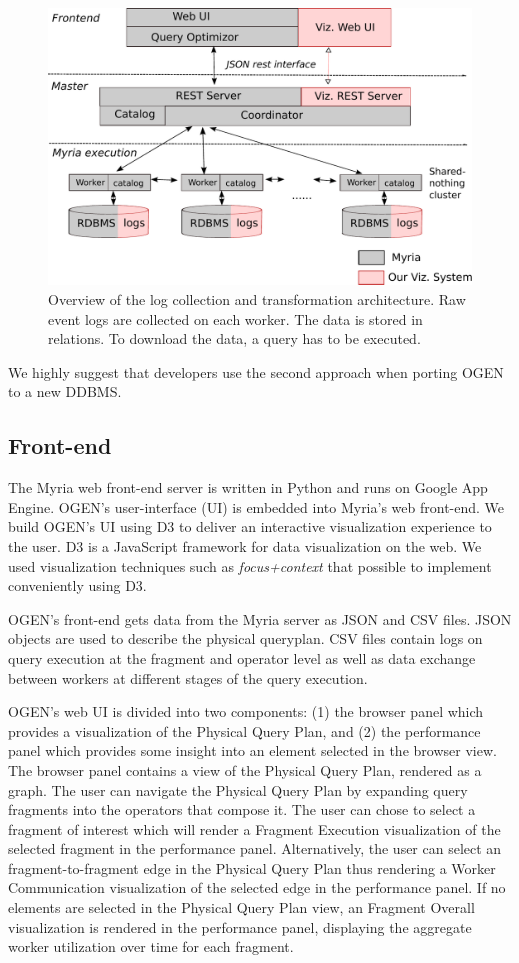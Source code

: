 \documentclass{chi2009}
\newcommand*{\system}{OGEN\xspace}
\newcommand*{\graph}{Physical Query Plan\xspace}
\newcommand*{\fragment}{Fragment Execution\xspace}
\newcommand*{\network}{Worker Communication\xspace}
\newcommand*{\overall}{Fragment Overall\xspace}
\begin{document}
\begin{figure}[ht]
  \includegraphics[width=\columnwidth]{images/viz_arch}
  \caption{Overview of the log collection and transformation architecture. Raw event logs are collected on each worker. The data is stored in relations. To download the data, a query has to be executed.}
  \label{fig:arch}
\end{figure}

We highly suggest that developers use the second approach when porting \system to a new DDBMS.

\subsection{Front-end}

The Myria web front-end server is written in Python and runs on Google App Engine. \system's user-interface (UI) is embedded into Myria's web front-end. We build \system's UI using D3\cite{2011-d3} to deliver an interactive visualization experience to the user. D3 is a JavaScript framework for data visualization on the web. We used visualization techniques such as \emph{focus+context}\cite{furnas1986generalized} that possible to implement conveniently using D3.

\system's front-end gets data from the Myria server as JSON and CSV files. JSON objects are used to describe the physical queryplan. CSV files contain logs on query execution at the fragment and operator level as well as data exchange between workers at different stages of the query execution.

\system's web UI is divided into two components: (1) the browser panel which provides a visualization of the \graph, and (2) the performance panel which provides some insight into an element selected in the browser view. The browser panel contains a view of the \graph, rendered as a graph. The user can navigate the \graph by expanding query fragments into the operators that compose it. The user can chose to select a fragment of interest which will render a \fragment visualization of the selected fragment in the performance panel. Alternatively, the user can select an fragment-to-fragment edge in the \graph thus rendering a \network visualization of the selected edge in the performance panel. If no elements are selected in the \graph view, an \overall visualization is rendered in the performance panel, displaying the aggregate worker utilization over time for each fragment.
\end{document}
